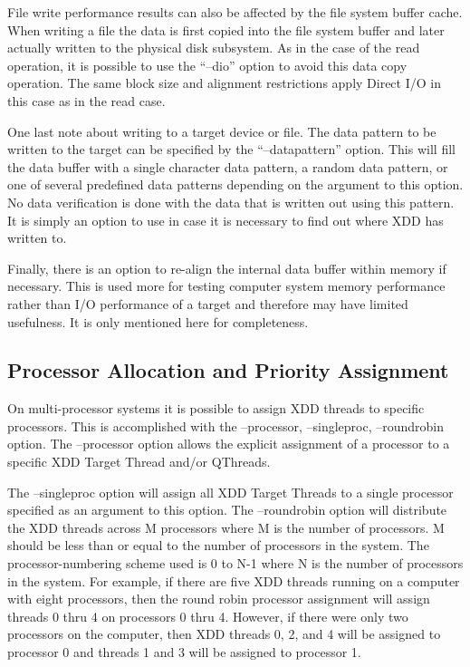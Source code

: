 File write performance results can also be affected by the file system buffer cache. When writing a file the data is first copied into the file system buffer and later actually written to the physical disk subsystem. As in the case of the read operation, it is possible to use the ``--dio'' option to avoid this data copy operation. The same block size and alignment restrictions apply Direct I/O in this case as in the read case.

One last note about writing to a target device or file. The data pattern to be written to the target can be specified by the ``--datapattern'' option. This will fill the data buffer with a single character data pattern, a random data pattern, or one of several predefined data patterns depending on the argument to this option. No data verification is done with the data that is written out using this pattern. It is simply an option to use in case it is necessary to find out where XDD has written to.

Finally, there is an option to re-align the internal data buffer within memory if necessary. This is used more for testing computer system memory performance rather than I/O performance of a target and therefore may have limited usefulness. It is only mentioned here for completeness.

\subsection{Processor Allocation and Priority Assignment}\label{processor-allocation-and-priority-assignment}

On multi-processor systems it is possible to assign XDD threads to specific processors. This is accomplished with the --processor, --singleproc, --roundrobin option. The --processor option allows the explicit assignment of a processor to a specific XDD Target Thread and/or QThreads.

The --singleproc option will assign all XDD Target Threads to a single processor specified as an argument to this option. The --roundrobin option will distribute the XDD threads across M processors where M is the number of processors. M should be less than or equal to the number of processors in the system. The processor-numbering scheme used is 0 to N-1 where N is the number of processors in the system. For example, if there are five XDD threads running on a computer with eight processors, then the round robin processor assignment will assign threads 0 thru 4 on processors 0 thru 4. However, if there were only two processors on the computer, then XDD threads 0, 2, and 4 will be assigned to processor 0 and threads 1 and 3 will be assigned to processor 1.

